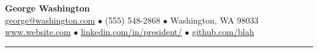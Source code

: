 \documentclass[letterpaper, onecolumn, oneside]{article}
\begin{document}

\begin{center}

{\Large \bfseries George Washington}\\[4pt]
\href{mailto:george@washington.com}{george@washington.com} $\bullet$ (555) 548-2868 $\bullet$ Washington, WA 98033 \\
\url{www.website.com} $\bullet$ \url{linkedin.com/in/president/} $\bullet$ \url{github.com/blah}

\textcolor{litegrey}{\rule{\textwidth}{.1pt}}

\end{center}
\end{document}
